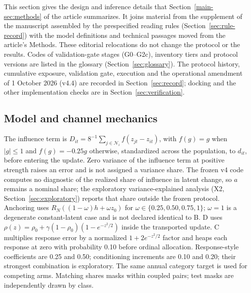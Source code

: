 
This section gives the design and inference details that Section~\ref{main-sec:methods} of the article summarizes. It joins material from the supplement of the manuscript assembled by the prespecified reading rules (Section~\ref{sec:rule-record}) with the model definitions and technical passages moved from the article's Methods. These editorial relocations do not change the protocol or the results. Codes of validation-gate stages (G0--G2c), inventory tiers and protocol versions are listed in the glossary (Section~\ref{sec:glossary}). The protocol history, cumulative exposure, validation gate, execution and the operational amendment of 1 October 2026 (v4.4) are recorded in Section~\ref{sec:record}; docking and the other implementation checks are in Section~\ref{sec:verification}.

\subsection{Model and channel mechanics}\label{sec:dd-channels}

The influence term is $D_{it}=8^{-1}\sum_{j\in\mathcal N_i}f(z_{jt}-z_{it})$, with $f(g)=g$ when $|g|\leq1$ and $f(g)=-0.25g$ otherwise, standardized across the population, to $d_{it}$, before entering the update. Zero variance of the influence term at positive strength raises an error and is not assigned a variance share. The frozen v4 code computes no diagnostic of the realized share of influence in latent change, so $a$ remains a nominal share; the exploratory variance-explained analysis (X2, Section~\ref{sec:exploratory}) reports that share outside the frozen protocol. Anchoring uses $R_N((1-\omega)h+\omega z_0)$ for $\omega\in\{0.25,0.50,0.75,1\}$; $\omega=1$ is a degenerate constant-latent case and is not declared identical to B. D uses $\rho(z)=\rho_0+\gamma(1-\rho_0)(1-e^{-z^2/2})$ inside the transported update. C multiplies response error by a normalized $1+2e^{-z^2/2}$ factor and heaps each response at zero with probability 0.10 before ordinal allocation. Response-style coefficients are 0.25 and 0.50; conditioning increments are 0.10 and 0.20; their strongest combination is exploratory. The same annual category target is used for competing arms. Matching shares masks within coupled pairs; test masks are independently drawn by class.

